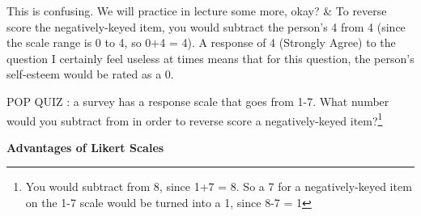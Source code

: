 \documentclass[
  letterpaper,
  DIV=11,
  numbers=noendperiod,
  oneside]{scrreprt}
\begin{document}
\begin{longtable}[]
This is confusing. We will practice in lecture some more, okay? & To
reverse score the negatively-keyed item, you would subtract the person's
4 from 4 (since the scale range is 0 to 4, so 0+4 = 4). A response of 4
(Strongly Agree) to the question I certainly feel useless at times means
that for this question, the person's self-esteem would be rated as a 0.

POP QUIZ : a survey has a response scale that goes from 1-7. What number
would you subtract from in order to reverse score a negatively-keyed
item?\footnote{You would subtract from 8, since 1+7 = 8. So a 7 for a
  negatively-keyed item on the 1-7 scale would be turned into a 1, since
  8-7 = 1} \\
\end{longtable}

\textbf{Advantages of Likert Scales}
\end{document}
